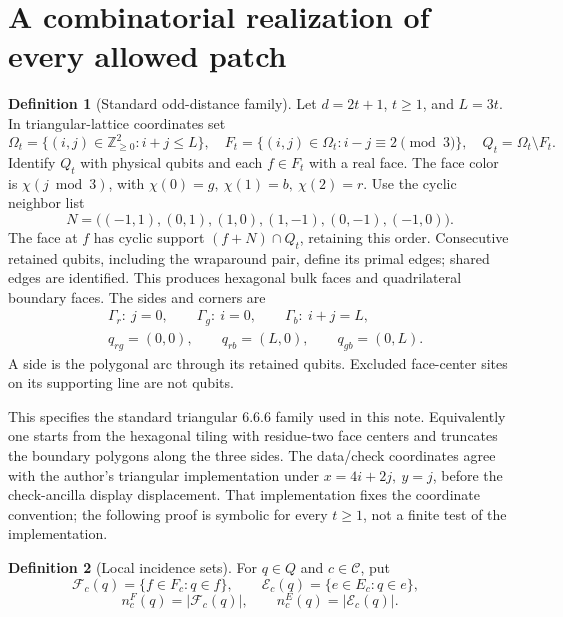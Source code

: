 \documentclass[11pt]{article}
\theoremstyle{definition}
\newtheorem{definition}{Definition}[section]
\theoremstyle{plain}
\theoremstyle{remark}
\newcommand{\C}{\mathcal C}
\begin{document}
\section{A combinatorial realization of every allowed patch}\label{sec:family}
\begin{definition}[Standard odd-distance family]\label{def:coords}
Let $d=2t+1$, $t\geq1$, and $L=3t$. In triangular-lattice coordinates set
\[
 \Omega_t=\{(i,j)\in\mathbb Z_{\geq0}^2:i+j\leq L\},\quad
 F_t=\{(i,j)\in\Omega_t:i-j\equiv2\pmod3\},\quad
 Q_t=\Omega_t\setminus F_t.
\]
Identify $Q_t$ with physical qubits and each $f\in F_t$ with a real face.
The face color is $\chi(j\bmod3)$, with
$\chi(0)=g,\ \chi(1)=b,\ \chi(2)=r$.
Use the cyclic neighbor list
\[
 N=\big((-1,1),(0,1),(1,0),(1,-1),(0,-1),(-1,0)\big).
\]
The face at $f$ has cyclic support $(f+N)\cap Q_t$, retaining this order.
Consecutive retained qubits, including the wraparound pair, define its
primal edges; shared edges are identified. This produces hexagonal bulk
faces and quadrilateral boundary faces. The sides and corners are
\begin{align*}
 &\Gamma_r:\ j=0,\qquad\Gamma_g:\ i=0,\qquad\Gamma_b:\ i+j=L,\\
 &q_{rg}=(0,0),\qquad q_{rb}=(L,0),\qquad q_{gb}=(0,L).
\end{align*}
A side is the polygonal arc through its retained qubits. Excluded
face-center sites on its supporting line are not qubits.
\end{definition}

This specifies the standard triangular 6.6.6 family used in this note.
Equivalently one starts from the hexagonal tiling with residue-two face
centers and truncates the boundary polygons along the three sides.
The data/check coordinates agree with the author's triangular
implementation \cite{Implementation} under $x=4i+2j,\ y=j$, before the
check-ancilla display displacement. That implementation fixes the
coordinate convention; the following proof is symbolic for every
$t\geq1$, not a finite test of the implementation.

\begin{definition}[Local incidence sets]\label{def:local}
For $q\in Q$ and $c\in\C$, put
\[
 \mathcal F_c(q)=\{f\in F_c:q\in f\},\qquad
 \mathcal E_c(q)=\{e\in E_c:q\in e\},\qquad
\]
\[
 n_c^F(q)=|\mathcal F_c(q)|,\qquad n_c^E(q)=|\mathcal E_c(q)|.
\]
\end{definition}
\end{document}
